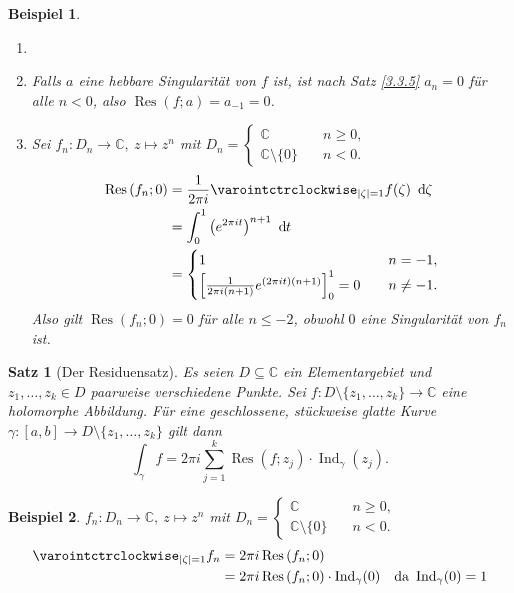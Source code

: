\documentclass[a4paper,12pt]{book}
\theoremstyle{newthm}
\newtheorem{thm}{Satz}[section]
\theoremstyle{newdef}
\theoremstyle{newrem}
\newtheorem*{exmp*}{Beispiel}
\newcommand{\C}{\mathbb{C}}
\renewcommand{\d}{\ \operatorname{d}\hspace{-2px}}
\newcommand{\Ind}[1]{\operatorname{Ind}_{#1}}
\newcommand{\Res}[2]{\operatorname{Res} \left( #1;#2 \right) }
\begin{document}
		\begin{exmp*}
			\begin{enumerate}[label={\alph*})]
				\item[]
				\item Falls $a$ eine hebbare Singularität von $f$ ist, ist nach Satz \ref{3.3.5} $a_n = 0$ für alle $n < 0$, also $\Res{f}{a} = a_{-1} = 0$.
				\item Sei $ f_n : D_n \to \C,\ z \mapsto z^n $ mit $ D_n = \begin{cases}
				\C \quad &n \geq 0,\\
				\C \setminus\{0\} \quad &n<0.
				\end{cases} $
				\begin{align*}
					\Res{f_n}{0} &= \frac{1}{2\pi i} \varointctrclockwise_{|\zeta| = 1} f(\zeta)\d\zeta\\
					&= \int_0^1 \left(e^{2\pi it}\right)^{n+1}\d t\\
					&= \begin{cases}
					1 \quad &n = -1,\\
					\left[ \frac{1}{2\pi i(n+1)} e^{(2\pi it)(n+1)} \right]_0^1 = 0 \quad &n \neq -1.
					\end{cases}
				\end{align*}
				Also gilt $ \Res{f_n}{0} = 0 $ für alle $n \leq -2$, obwohl $0$ eine Singularität von $f_n$ ist.
			\end{enumerate}
		\end{exmp*}
		
		\begin{thm}[Der Residuensatz]\label{3.4.4}
			Es seien $ D \subseteq \C $ ein Elementargebiet und $z_1,\dotsc,z_k \in D$ paarweise verschiedene Punkte. Sei $ f: D \setminus\{z_1,\dotsc,z_k\} \to \C $ eine holomorphe Abbildung. Für eine geschlossene, stückweise glatte Kurve $\gamma: [a,b] \to D \setminus\{z_1,\dotsc,z_k\}$ gilt dann
			\[ \int_\gamma f = 2\pi i \sum_{j=1}^k \Res{f}{z_j} \cdot \Ind{\gamma}(z_j). \]
		\end{thm}
		
		\begin{exmp*}
			$ f_n : D_n \to \C,\ z \mapsto z^n $ mit $ D_n = \begin{cases}
			\C \quad &n \geq 0,\\
			\C \setminus\{0\} \quad &n<0.
			\end{cases} $
			\begin{align*}
				\varointctrclockwise_{|\zeta| = 1} f_n &= 2\pi i \Res{f_n}{0}\\
				&= 2\pi i \Res{f_n}{0} \cdot \Ind{\gamma}(0) \quad \text{da } \Ind{\gamma}(0)=1
			\end{align*}
		\end{exmp*}
		
\end{document}
